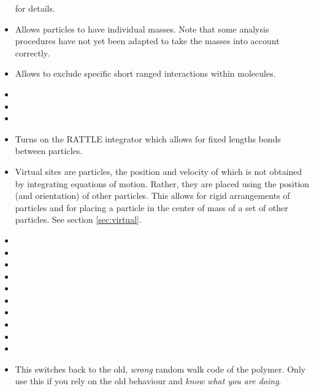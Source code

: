 \begin{itemize}
  for details.
\item {} Allows particles to have individual masses. Note
  that some analysis procedures have not yet been adapted to take the
  masses into account correctly.
\item {} Allows to exclude specific short ranged
  interactions within molecules.
\item {} 
\item {} 
\item {} 
\item {} Turns on the RATTLE integrator which
  allows for fixed lengths bonds between particles. 
\item {} Virtual sites are particles, the
  position and velocity of which is not obtained by integrating
  equations of motion. Rather, they are placed using the position (and
  orientation) of other particles. This allows for rigid arrangements
  of particles and for placing a particle in the center of mass of a
  set of other particles. See section \ref{sec:virtual}.
\item {}
\item {}
\item {}
\item {}
\item {}
\item {}
\item {}
\item {}
\item {}
\item {}
\item {} This switches back to the old,
\emph{wrong} random walk code of the polymer. Only use this if you
rely on the old behaviour and \emph{know what you are doing}.
\end{itemize}

